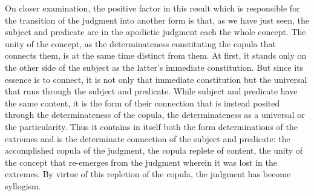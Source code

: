 On closer examination, the positive factor in this result
which is responsible for the transition of the judgment
into another form is that, as we have just seen,
the subject and predicate are in the apodictic judgment
each the whole concept.
The unity of the concept, as the determinateness
constituting the copula that connects them,
is at the same time distinct from them.
At first, it stands only on
the other side of the subject
as the latter's immediate constitution.
But since its essence is to connect,
it is not only that immediate constitution
but the universal that runs through
the subject and predicate.
While subject and predicate have the same content,
it is the form of their connection
that is instead posited through
the determinateness of the copula,
the determinateness as a universal or the particularity.
Thus it contains in itself both
the form determinations of the extremes
and is the determinate connection of the subject and predicate:
the accomplished copula of the judgment,
the copula replete of content,
the unity of the concept that re-emerges from the judgment
wherein it was lost in the extremes.
By virtue of this repletion of the copula,
the judgment has become syllogism.
